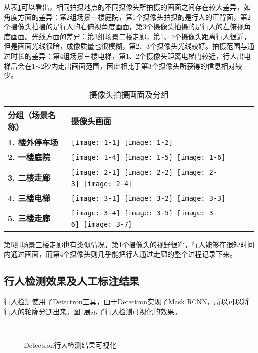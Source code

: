 从表\ref{tab:cameraslayout}可以看出，相同拍摄地点的不同摄像头所拍摄的画面之间存在较大差异，如角度方面的差异：第2组场景一楼庭院，第1个摄像头拍摄的是行人的正背面，第2个摄像头拍摄的是行人的右俯视角度画面，第3个摄像头拍摄的是行人的左俯视角度画面。光线方面的差异：第3组场景二楼走廊，第1、4个摄像头距离行人很近，但是画面光线很暗，成像质量也很模糊，第2、3个摄像头光线较好。拍摄范围与通过时长的差异：第4组场景三楼电梯，第1、2个摄像头距离电梯门较近，行人出电梯后会在1$\sim$2秒内走出画面范围，因此相比于第3个摄像头所获得的信息相对较少。
\begin{table}[ht]
\centering
\caption{摄像头拍摄画面及分组}
\label{tab:cameraslayout}
\renewcommand{\arraystretch}{1.5}%
\begin{tabularx}{\textwidth}{>{\centering\bfseries}m{} >{\centering\arraybackslash}m{}}
\toprule
分组（场景名称） & \textbf{摄像头画面} \\
\midrule
1. 楼外停车场 & \texttt{[image: 1-1]}~\texttt{[image: 1-2]} \\
2. 一楼庭院 & \texttt{[image: 1-4]}~\texttt{[image: 1-5]}~\texttt{[image: 1-6]} \\
3. 二楼走廊 & \texttt{[image: 2-1]}~\texttt{[image: 2-2]}~\texttt{[image: 2-3]}~\texttt{[image: 2-4]} \\
4. 三楼电梯 & \texttt{[image: 3-1]}~\texttt{[image: 3-2]}~\texttt{[image: 3-3]} \\
5. 三楼走廊 & \texttt{[image: 3-4]}~\texttt{[image: 3-5]}~\texttt{[image: 3-6]}~\texttt{[image: 3-7]} \\
\bottomrule
\end{tabularx}
\end{table}
第5组场景三楼走廊也有类似情况，第1个摄像头的视野很窄，行人能够在很短时间内通过画面，而第4个摄像头则几乎能把行人通过走廊的整个过程记录下来。

\subsection{行人检测效果及人工标注结果}

行人检测使用了Detectron工具，由于Detectron实现了Mask RCNN，所以可以将行人的轮廓分割出来。图\ref{fig:detectron}展示了行人检测可视化的效果。

\begin{figure}
\centering
\subfloat[场景1]{\centering\texttt{[image: 1-2\_5\_151]}}\quad
\subfloat[场景2]{\centering\texttt{[image: 3-7\_10\_394]}}\\
\quad
{}
\caption{Detectron行人检测结果可视化}
\label{fig:detectron}
\end{figure}

